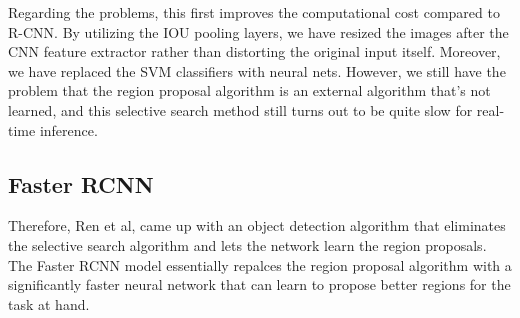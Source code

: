 \documentclass{article}
\begin{document}
    Regarding the problems, this first improves the computational cost compared to R-CNN. By utilizing the IOU pooling layers, we have resized the images after the CNN feature extractor rather than distorting the original input itself. Moreover, we have replaced the SVM classifiers with neural nets. However, we still have the problem that the region proposal algorithm is an external algorithm that's not learned, and this selective search method still turns out to be quite slow for real-time inference.  

  \subsection{Faster RCNN}

    Therefore, Ren et al, came up with an object detection algorithm that eliminates the selective search algorithm and lets the network learn the region proposals. The Faster RCNN model essentially repalces the region proposal algorithm with a significantly faster neural network that can learn to propose better regions for the task at hand. 
    \begin{center}
    \end{center}
\end{document}
